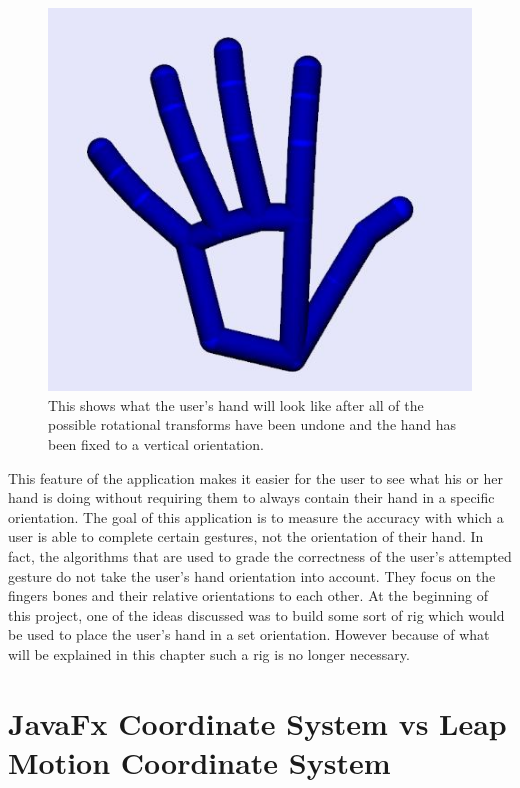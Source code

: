 \begin{figure}[H]
\centering
\includegraphics[scale=0.45]{Figures/4_handFinalFix.JPG}
\caption[Hand Fixed to Vertical Orientation]{This shows what the user's hand will look like after all of the possible rotational transforms have been undone and the hand has been fixed to a vertical orientation.}
\label{fig:weirdHandShake}
\end{figure}
This feature of the application makes it easier for the user to see what his or her hand is doing without requiring them to always contain their hand in a specific orientation. The goal of this application is to measure the accuracy with which a user is able to complete certain gestures, not the orientation of their hand. In fact, the algorithms that are used to grade the correctness of the user's attempted gesture do not take the user's hand orientation into account. They focus on the fingers bones and their relative orientations to each other. At the beginning of this project, one of the ideas discussed was to build some sort of rig which would be used to place the user's hand in a set orientation. However because of what will be explained in this chapter such a rig is no longer necessary.




\section{JavaFx Coordinate System vs Leap Motion Coordinate System}
	


